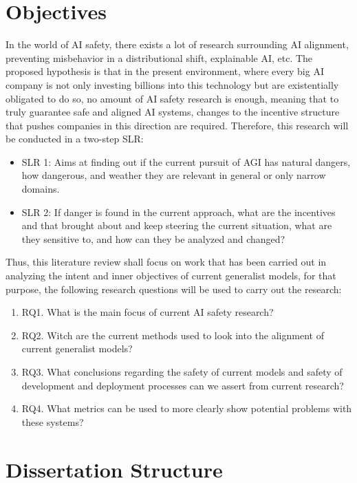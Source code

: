 \section{Objectives}

In the world of AI safety, there exists a lot of research surrounding AI alignment, preventing misbehavior in a distributional shift, explainable AI, etc. The proposed hypothesis is that in the present environment, where every big AI company is not only investing billions into this technology but are existentially obligated to do so, no amount of AI safety research is enough, meaning that to truly guarantee safe and aligned AI systems, changes to the incentive structure that pushes companies in this direction are required. Therefore, this research will be conducted in a two-step SLR:
\begin{itemize}
    \item SLR 1: Aims at finding out if the current pursuit of AGI has natural dangers, how dangerous, and weather they are relevant in general or only narrow domains.
    \item SLR 2: If danger is found in the current approach, what are the incentives and that brought about and keep steering the current situation, what are they sensitive to, and how can they be analyzed and changed?
\end{itemize}

Thus, this literature review shall focus on work that has been carried out in analyzing the intent and inner objectives of current generalist models, for that purpose, the following research questions will be used to carry out the research:

\begin{enumerate}
    \item RQ1. What is the main focus of current AI safety research?  
    \item RQ2. Witch are the current methods used to look into the alignment of current generalist models?
    \item RQ3. What conclusions regarding the safety of current models and safety of development and deployment processes can we assert from current research?
    \item RQ4. What metrics can be used to more clearly show potential problems with these systems? 
\end{enumerate}

\section{Dissertation Structure}

\newpage